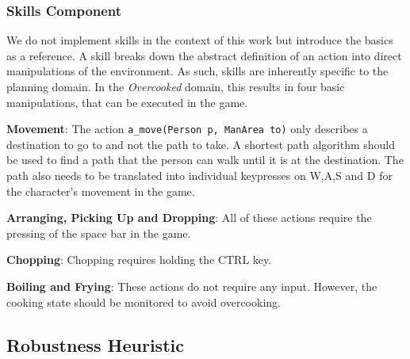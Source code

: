 \subsubsection{Skills Component}

We do not implement skills in the context of this work but introduce the basics as a reference.
A skill breaks down the abstract definition of an action into direct manipulations of the environment.
As such, skills are inherently specific to the planning domain.
In the \textit{Overcooked} domain, this results in four basic manipulations, that can be executed in the game.

\textbf{Movement}: The action \verb|a_move(Person p, ManArea to)| only describes a destination to go to and not the path to take. 
A shortest path algorithm should be used to find a path that the person can walk until it is at the destination. 
The path also needs to be translated into individual keypresses on W,A,S and D for the character's movement in the game.

\textbf{Arranging, Picking Up and Dropping}: All of these actions require the pressing of the space bar in the game.

\textbf{Chopping}: Chopping requires holding the CTRL key.

\textbf{Boiling and Frying}: These actions do not require any input. 
However, the cooking state should be monitored to avoid overcooking.





\subsection{Robustness Heuristic}
\label{sec:approach-robustness}

